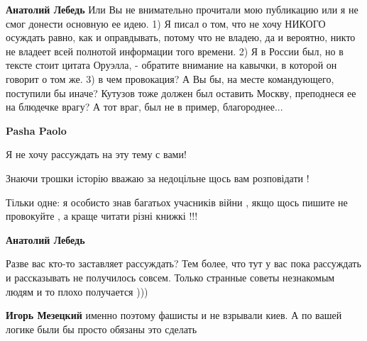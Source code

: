 \begin{itemize}
\begin{itemize}
\begin{itemize}
 
\textbf{Анатолий Лебедь} Или Вы не внимательно прочитали мою публикацию или я
не смог донести основную ее идею. 1) Я писал о том, что не хочу НИКОГО осуждать
равно, как и оправдывать, потому что не владею, да и вероятно, никто не владеет
всей полнотой информации того времени. 2) Я в России был, но в тексте стоит
цитата Оруэлла, - обратите внимание на кавычки, в которой он говорит о том же.
3) в чем провокация? А Вы бы, на месте командующего, поступили бы иначе?
Кутузов тоже должен был оставить Москву, преподнеся ее на блюдечке врагу? А тот
враг, был не в пример, благороднее...

 
\textbf{Pasha Paolo}

Я не хочу рассуждать на эту тему с вами!

Знаючи трошки історію вважаю за недоцільне щось вам розповідати !

Тільки одне: я особисто знав багатьох учасників війни , якщо щось пишите не
провокуйте , а краще читати різні книжкі !!!


 
\textbf{Анатолий Лебедь} 

Разве вас кто-то заставляет рассуждать? Тем более, что тут у вас пока рассуждать
и рассказывать не получилось совсем. Только странные советы незнакомым людям и
то плохо получается )))

 
\textbf{Игорь Мезецкий} именно поэтому фашисты и не взрывали киев. А по вашей логике были бы просто обязаны это сделать



\end{itemize}
\end{itemize}
\end{itemize}
